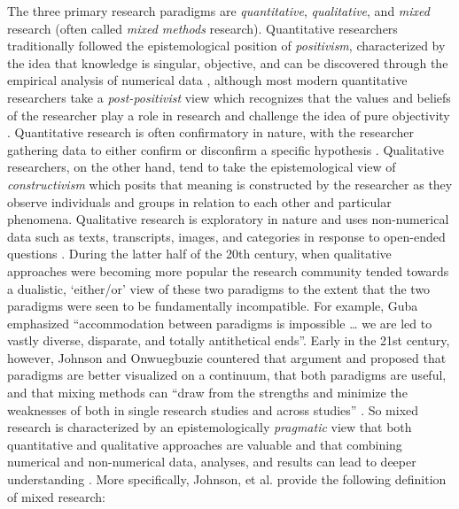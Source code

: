 \documentclass[
]{book}
\begin{document}
The three primary research paradigms are \emph{quantitative}, \emph{qualitative}, and \emph{mixed} research (often called \emph{mixed methods} research). Quantitative researchers traditionally followed the epistemological position of \emph{positivism}, characterized by the idea that knowledge is singular, objective, and can be discovered through the empirical analysis of numerical data \citep{heldDecolonizingResearchParadigms2019}, although most modern quantitative researchers take a \emph{post-positivist} view which recognizes that the values and beliefs of the researcher play a role in research and challenge the idea of pure objectivity \citep{tashakkoriFoundationsMixedMethods2020}. Quantitative research is often confirmatory in nature, with the researcher gathering data to either confirm or disconfirm a specific hypothesis \citep{johnsonEducationalResearchQuantitative2017}. Qualitative researchers, on the other hand, tend to take the epistemological view of \emph{constructivism} which posits that meaning is constructed by the researcher as they observe individuals and groups in relation to each other and particular phenomena. Qualitative research is exploratory in nature and uses non-numerical data such as texts, transcripts, images, and categories \citep{johnsonEducationalResearchQuantitative2017} in response to open-ended questions \citep{tashakkoriFoundationsMixedMethods2020}. During the latter half of the 20th century, when qualitative approaches were becoming more popular the research community tended towards a dualistic, `either/or' view of these two paradigms \citep{niglasMultidimensionalModelResearch2010, tashakkoriFoundationsMixedMethods2020} to the extent that the two paradigms were seen to be fundamentally incompatible. For example, Guba \citetext{\citeyear[p.~81 as quoted in]{gubaParadigmDialog1990}; \citealp[p.~14]{johnsonMixedMethodsResearch2004}} emphasized ``accommodation between paradigms is impossible \ldots{} we are led to vastly diverse, disparate, and totally antithetical ends''. Early in the 21st century, however, Johnson and Onwuegbuzie countered that argument and proposed that paradigms are better visualized on a continuum, that both paradigms are useful, and that mixing methods can ``draw from the strengths and minimize the weaknesses of both in single research studies and across studies'' \citeyearpar[p.~13-14]{johnsonMixedMethodsResearch2004}. So mixed research is characterized by an epistemologically \emph{pragmatic} view that both quantitative and qualitative approaches are valuable and that combining numerical and non-numerical data, analyses, and results can lead to deeper understanding \citep{bazeleyIntegratingAnalysesMixed2018, tashakkoriFoundationsMixedMethods2020}. More specifically, Johnson, et al. \citeyearpar{johnsonDefinitionMixedMethods2007} provide the following definition of mixed research:
\end{document}
